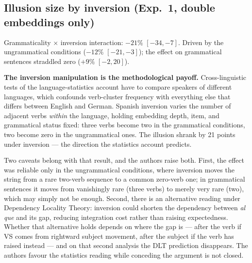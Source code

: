 \documentclass[11pt, a4paper]{article}
\begin{document}
\subsection*{Illusion size by inversion (Exp.\ 1, double embeddings only)}
\begin{center}
\end{center}
\begingroup\RaggedRight\footnotesize\ttfamily\color{midgray}Grammaticality $\times$ inversion interaction: $-21\%$ $[-34,-7]$. Driven by the ungrammatical conditions ($-12\%$ $[-21,-3]$); the effect on grammatical sentences straddled zero ($+9\%$ $[-2,20]$).\par\endgroup

\vspace{0.8em}
\textbf{The inversion manipulation is the methodological payoff.} Cross-linguistic tests of the language-statistics account have to compare speakers of different languages, which confounds verb-cluster frequency with everything else that differs between English and German. Spanish inversion varies the number of adjacent verbs \emph{within} the language, holding embedding depth, item, and grammatical status fixed: three verbs become two in the grammatical conditions, two become zero in the ungrammatical ones. The illusion shrank by 21 points under inversion --- the direction the statistics account predicts.

Two caveats belong with that result, and the authors raise both. First, the effect was reliable only in the ungrammatical conditions, where inversion moves the string from a rare two-verb sequence to a common zero-verb one; in grammatical sentences it moves from vanishingly rare (three verbs) to merely very rare (two), which may simply not be enough. Second, there is an alternative reading under Dependency Locality Theory: inversion could shorten the dependency between \emph{al que} and its gap, reducing integration cost rather than raising expectedness. Whether that alternative holds depends on where the gap is --- after the verb if VS comes from rightward subject movement, after the subject if the verb has raised instead --- and on that second analysis the DLT prediction disappears. The authors favour the statistics reading while conceding the argument is not closed.
\end{document}
